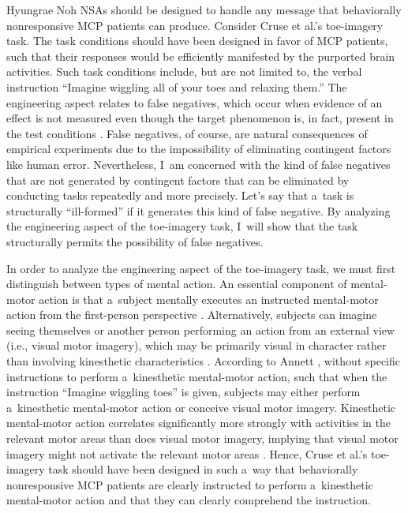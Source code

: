\begin{artengenv}{Hyungrae Noh}
NSAs should be designed to handle any message that behaviorally nonresponsive MCP patients can produce. Consider Cruse et al.'s
\parencite*[][]{cruse_bedside_2011} %
 toe-imagery task. The task conditions should have been designed in favor of MCP patients, such that their responses would be efficiently manifested by the purported brain activities. Such task conditions include, but are not limited to, the verbal instruction ``Imagine wiggling all of your toes and relaxing them.'' The engineering aspect relates to false negatives, which occur when evidence of an effect is not measured even though the target phenomenon is, in fact, present in the test conditions 
\parencite[][p.591]{peterson_risk_2015}. %
 False negatives, of course, are natural consequences of empirical experiments due to the impossibility of eliminating contingent factors like human error. Nevertheless, I~am concerned with the kind of false negatives that are not generated by contingent factors that can be eliminated by conducting tasks repeatedly and more precisely. Let's say that a~task is structurally ``ill-formed'' if it generates this kind of false negative. By analyzing the engineering aspect of the toe-imagery task, I~will show that the task structurally permits the possibility of false negatives.

In order to analyze the engineering aspect of the toe-imagery task, we must first distinguish between types of mental action. An essential component of mental-motor action is that a~subject mentally executes an instructed mental-motor action from the first-person perspective
\parencite[i.e., kinesthetic mental-motor action][]{ehrsson_imagery_2003}. %
 Alternatively, subjects can imagine seeing themselves or another person performing an action from an external view (i.e., visual motor imagery), which may be primarily visual in character rather than involving kinesthetic characteristics 
\parencite[][]{sekiyama_mental_1983}. %
 According to Annett 
\parencite*[][]{annett_motor_1995}, %
 without specific instructions to perform a~kinesthetic mental-motor action, such that when the instruction ``Imagine wiggling toes'' is given, subjects may either perform a~kinesthetic mental-motor action or conceive visual motor imagery. Kinesthetic mental-motor action correlates significantly more strongly with activities in the relevant motor areas than does visual motor imagery, implying that visual motor imagery might not activate the relevant motor areas 
\parencite[][]{neuper_imagery_2005}. %
 Hence, Cruse et al.'s toe-imagery task should have been designed in such a~way that behaviorally nonresponsive MCP patients are clearly instructed to perform a~kinesthetic mental-motor action and that they can clearly comprehend the instruction.


\end{artengenv}
